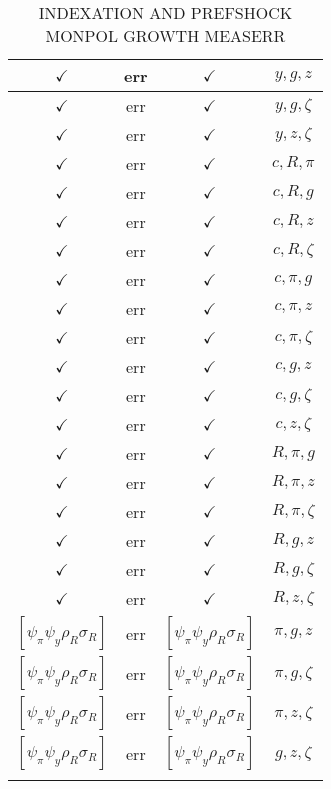\documentclass[a4paper,10pt]{article}
\begin{document}
\begin{longtable}{|c|c|c|c|}
\hline
$\checkmark$ & err & $\checkmark$ & ${y},{g},{z}$ \\
\hline
$\checkmark$ & err & $\checkmark$ & ${y},{g},{\zeta}$ \\
\hline
$\checkmark$ & err & $\checkmark$ & ${y},{z},{\zeta}$ \\
\hline
$\checkmark$ & err & $\checkmark$ & ${c},{R},{\pi}$ \\
\hline
$\checkmark$ & err & $\checkmark$ & ${c},{R},{g}$ \\
\hline
$\checkmark$ & err & $\checkmark$ & ${c},{R},{z}$ \\
\hline
$\checkmark$ & err & $\checkmark$ & ${c},{R},{\zeta}$ \\
\hline
$\checkmark$ & err & $\checkmark$ & ${c},{\pi},{g}$ \\
\hline
$\checkmark$ & err & $\checkmark$ & ${c},{\pi},{z}$ \\
\hline
$\checkmark$ & err & $\checkmark$ & ${c},{\pi},{\zeta}$ \\
\hline
$\checkmark$ & err & $\checkmark$ & ${c},{g},{z}$ \\
\hline
$\checkmark$ & err & $\checkmark$ & ${c},{g},{\zeta}$ \\
\hline
$\checkmark$ & err & $\checkmark$ & ${c},{z},{\zeta}$ \\
\hline
$\checkmark$ & err & $\checkmark$ & ${R},{\pi},{g}$ \\
\hline
$\checkmark$ & err & $\checkmark$ & ${R},{\pi},{z}$ \\
\hline
$\checkmark$ & err & $\checkmark$ & ${R},{\pi},{\zeta}$ \\
\hline
$\checkmark$ & err & $\checkmark$ & ${R},{g},{z}$ \\
\hline
$\checkmark$ & err & $\checkmark$ & ${R},{g},{\zeta}$ \\
\hline
$\checkmark$ & err & $\checkmark$ & ${R},{z},{\zeta}$ \\
\hline
$[\psi_\pi \psi_y \rho_R \sigma_R ]$ & err & $[\psi_\pi \psi_y \rho_R \sigma_R ]$ & ${\pi},{g},{z}$ \\
\hline
$[\psi_\pi \psi_y \rho_R \sigma_R ]$ & err & $[\psi_\pi \psi_y \rho_R \sigma_R ]$ & ${\pi},{g},{\zeta}$ \\
\hline
$[\psi_\pi \psi_y \rho_R \sigma_R ]$ & err & $[\psi_\pi \psi_y \rho_R \sigma_R ]$ & ${\pi},{z},{\zeta}$ \\
\hline
$[\psi_\pi \psi_y \rho_R \sigma_R ]$ & err & $[\psi_\pi \psi_y \rho_R \sigma_R ]$ & ${g},{z},{\zeta}$ \\
\hline
\caption{INDEXATION AND PREFSHOCK MONPOL GROWTH MEASERR}
\label{table:MyTableLabel}
\end{longtable}
\end{document}
